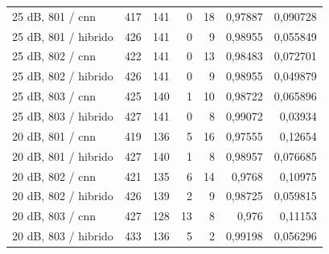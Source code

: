 \begin{longtable}{@{}p{.38\linewidth}rrrrrr@{}}
25 dB, 801 /\allowbreak{} cnn & 417 & 141 & 0 & 18 & 0,97887 & 0,090728\\
25 dB, 801 /\allowbreak{} hibrido & 426 & 141 & 0 & 9 & 0,98955 & 0,055849\\
25 dB, 802 /\allowbreak{} cnn & 422 & 141 & 0 & 13 & 0,98483 & 0,072701\\
25 dB, 802 /\allowbreak{} hibrido & 426 & 141 & 0 & 9 & 0,98955 & 0,049879\\
25 dB, 803 /\allowbreak{} cnn & 425 & 140 & 1 & 10 & 0,98722 & 0,065896\\
25 dB, 803 /\allowbreak{} hibrido & 427 & 141 & 0 & 8 & 0,99072 & 0,03934\\
20 dB, 801 /\allowbreak{} cnn & 419 & 136 & 5 & 16 & 0,97555 & 0,12654\\
20 dB, 801 /\allowbreak{} hibrido & 427 & 140 & 1 & 8 & 0,98957 & 0,076685\\
20 dB, 802 /\allowbreak{} cnn & 421 & 135 & 6 & 14 & 0,9768 & 0,10975\\
20 dB, 802 /\allowbreak{} hibrido & 426 & 139 & 2 & 9 & 0,98725 & 0,059815\\
20 dB, 803 /\allowbreak{} cnn & 427 & 128 & 13 & 8 & 0,976 & 0,11153\\
20 dB, 803 /\allowbreak{} hibrido & 433 & 136 & 5 & 2 & 0,99198 & 0,056296\\
\bottomrule\end{longtable}\normalsize

